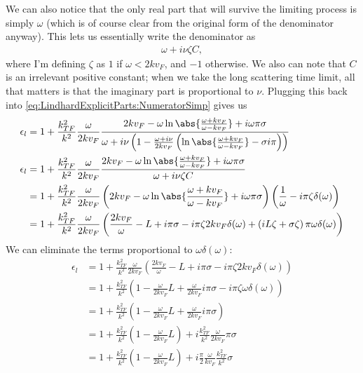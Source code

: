 \documentclass[../../main.tex]{subfiles}
\newcommand{\vf}{v_F}
\begin{document}
We can also notice that the only real part that will survive the limiting process is simply $\omega$ (which is of course clear from the original form of the denominator anyway). This lets us essentially write the denominator as
\begin{align}
	\omega + i \nu \zeta C,
\end{align}
where I'm defining $\zeta$ as $1$ if $\omega < 2k\vf$, and $-1$ otherwise. We also can note that $C$ is an irrelevant positive constant; when we take the long scattering time limit, all that matters is that the imaginary part is proportional to $\nu$. Plugging this back into \eqref{eq:LindhardExplicitParts:NumeratorSimp} gives us
\begin{align}
	\epsilon_l &= 1 + \frac{k_{TF}^2}{k^2} \frac{\omega}{2 k \vf} \frac{ 2 k\vf - \omega \ln\abs{\frac{\omega + k\vf}{\omega - k\vf}} + i \omega \pi \sigma}{\omega + i \nu\left( 1 - \frac{\omega + i \nu}{2 k\vf} \left(\ln\abs{\frac{\omega + k\vf}{\omega - k\vf}} - \sigma i \pi\right)\right)} \\
	\epsilon_l &=  1 + \frac{k_{TF}^2}{k^2} \frac{\omega}{2 k \vf} \frac{ 2 k\vf - \omega \ln\abs{\frac{\omega + k\vf}{\omega - k\vf}} + i \omega\pi \sigma}{\omega + i \nu \zeta C}  \\
	&= 1 + \frac{k_{TF}^2}{k^2} \frac{\omega}{2 k \vf} \left( 2 k\vf - \omega \ln\abs{\frac{\omega + k\vf}{\omega - k\vf}} + i \omega \pi \sigma\right)\left(\frac{1}{\omega} - i \pi \zeta \delta(\omega) \right) \\
	&= 1 + \frac{k_{TF}^2}{k^2} \frac{\omega}{2 k \vf} \left( \frac{2k\vf}{\omega}- L + i \pi \sigma - i \pi \zeta 2 k \vf \delta(\omega)  +\left( i  L \zeta + \sigma \zeta\right) \pi \omega \delta(\omega)\right)
\end{align}
We can eliminate the terms proportional to $\omega \delta(\omega)$:
\begin{align}
	\epsilon_l &= 1 + \frac{k_{TF}^2}{k^2} \frac{\omega}{2 k \vf} \left( \frac{2k\vf}{\omega}- L + i \pi \sigma - i \pi \zeta 2 k \vf \delta(\omega) \right) \\
	&= 1 + \frac{k_{TF}^2}{k^2} \left( 1 -\frac{\omega}{2 k \vf} L + \frac{\omega}{2 k \vf} i\pi \sigma - i \pi \zeta\omega \delta(\omega) \right) \\
	&= 1 + \frac{k_{TF}^2}{k^2} \left( 1 -\frac{\omega}{2 k \vf} L + \frac{\omega}{2 k \vf} i \pi\sigma  \right) \\
	&= 1 + \frac{k_{TF}^2}{k^2} \left( 1 -\frac{\omega}{2 k \vf} L \right) + i  \frac{k_{TF}^2}{k^2} \frac{\omega}{2 k \vf} \pi\sigma \\
	&= 1 + \frac{k_{TF}^2}{k^2} \left( 1 -\frac{\omega}{2 k \vf} L \right) + i \frac{\pi}{2} \frac{\omega}{ k \vf} \frac{k_{TF}^2}{k^2}  \sigma \label{eq:LindhardExplicitParts:LindhardSimp}
\end{align}
\end{document}
